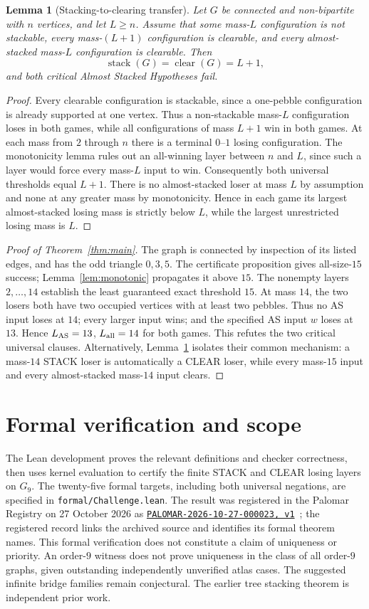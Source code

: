 \documentclass[10pt,a4paper]{article}
\newtheorem{lemma}{Lemma}[section]
\newcommand{\PalomarEntry}{\href{https://palomar-registry.org/entry.html?id=PALOMAR-2026-10-27-000023\&version=1}{\texttt{PALOMAR-2026-10-27-000023, v1}}}
\begin{document}
\begin{lemma}[Stacking-to-clearing transfer]\label{lem:transfer}
Let $G$ be connected and non-bipartite with $n$ vertices, and let $L\ge n$.
Assume that some mass-$L$ configuration is not stackable,
every mass-$(L+1)$ configuration is clearable, and every almost-stacked
mass-$L$ configuration is clearable. Then
\[
\operatorname{stack}(G)=\operatorname{clear}(G)=L+1,
\]
and both critical Almost Stacked Hypotheses fail.
\end{lemma}
\begin{proof}
Every clearable configuration is stackable, since a one-pebble
configuration is already supported at one vertex. Thus a non-stackable
mass-$L$ configuration loses in both games, while all configurations
of mass $L+1$ win in both games. At each mass from $2$ through $n$
there is a terminal $0$--$1$ losing configuration. The monotonicity
lemma rules out an all-winning layer between $n$ and $L$, since such
a layer would force every mass-$L$ input to win.
Consequently both universal thresholds equal $L+1$.
There is no almost-stacked loser at mass $L$ by assumption and none
at any greater mass by monotonicity. Hence in each game its
largest almost-stacked losing mass is strictly below $L$, while
the largest unrestricted losing mass is $L$.
\end{proof}

\begin{proof}[Proof of Theorem~\ref{thm:main}]
The graph is connected by inspection of its listed edges, and has the odd triangle \(0,3,5\). The certificate proposition gives all-size-\(15\) success; Lemma~\ref{lem:monotonic} propagates it above \(15\). The nonempty layers \(2,\ldots,14\) establish the least guaranteed exact threshold \(15\). At mass \(14\), the two losers both have two occupied vertices with at least two pebbles. Thus no AS input loses at \(14\); every larger input wins; and the specified AS input \(w\) loses at \(13\). Hence \(L_{\rm AS}=13\), \(L_{\rm all}=14\) for both games. This refutes the two critical universal clauses.
Alternatively, Lemma~\ref{lem:transfer} isolates their common mechanism:
a mass-$14$ STACK loser is automatically a CLEAR loser, while every
mass-$15$ input and every almost-stacked mass-$14$ input clears.
\end{proof}
\section{Formal verification and scope}
The Lean development proves the relevant definitions and checker correctness, then uses kernel evaluation to certify the finite STACK and CLEAR losing layers on \(G_9\). The twenty-five formal targets, including both universal negations, are specified in \texttt{formal/Challenge.lean}. The result was registered in the Palomar Registry on 27 October 2026 as \PalomarEntry\ \cite{PalomarG9}; the registered record links the archived source and identifies its formal theorem names. This formal verification does not constitute a claim of uniqueness or priority.
An order-\(9\) witness does not prove uniqueness in the class of all order-\(9\) graphs, given outstanding independently unverified atlas cases. The suggested infinite bridge families remain conjectural. The earlier tree stacking theorem \cite{TreeStack} is independent prior work.
\end{document}

